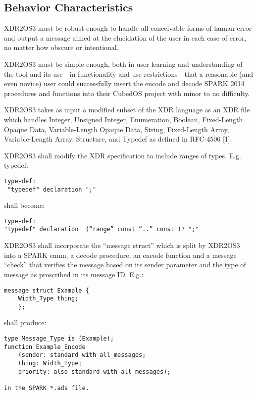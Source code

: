 \subsection{Behavior Characteristics}

XDR2OS3 must be robust enough to handle all conceivable forms of human error and output a
message aimed at the elucidation of the user in each case of error, no matter how obscure or
intentional.

XDR2OS3 must be simple enough, both in user learning and understanding of the tool and its
use—in functionality and use-restrictions—that a reasonable (and even novice) user could
successfully insert the encode and decode SPARK 2014 procedures and functions into their CubedOS
project with minor to no difficulty.

XDR2OS3 takes as input a modified subset of the XDR language as an XDR file which handles
Integer, Unsigned Integer, Enumeration, Boolean, Fixed-Length Opaque Data, Variable-Length
Opaque Data, String, Fixed-Length Array, Variable-Length Array, Structure, and Typedef as
defined in RFC-4506 [1].

XDR2OS3 shall modify the XDR specification to include ranges of types. E.g. typedef:

\begin{verbatim}
type-def:          
 "typedef" declaration ";"
\end{verbatim} 

shall become:

\begin{verbatim}
type-def:
"typedef" declaration  (“range” const “..” const )? ";"         
\end{verbatim}

XDR2OS3 shall incorporate the ``message struct'' which is split by XDR2OS3 into a SPARK enum, a
decode procedure, an encode function and a message “check” that verifies the message based on
its sender parameter and the type of message as proscribed in its message ID. E.g.:

\begin{verbatim}
message struct Example {
	Width_Type thing;
	};
\end{verbatim}

shall produce:

\begin{verbatim}
type Message_Type is (Example);
function Example_Encode 
	(sender: standard_with_all_messages; 
	thing: Width_Type; 
	priority: also_standard_with_all_messages);

in the SPARK *.ads file.
\end{verbatim}

